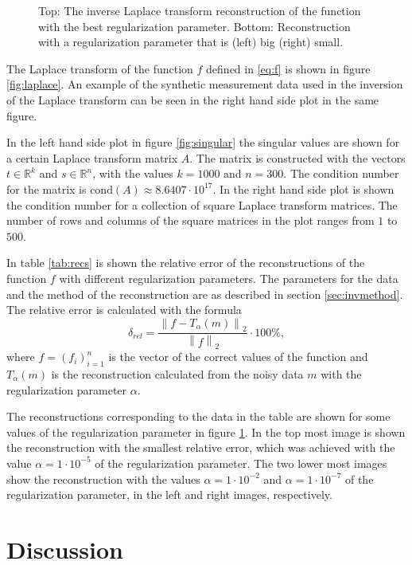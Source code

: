 \documentclass[12pt,a4]{article}
\newcommand{\R}{{\mathbb R}}
\newcommand{\cond}{\ensuremath{\text{cond}}}
\begin{document}
\begin{figure}[h!]
\begin{center}
\end{center}
\caption{Top: The inverse Laplace transform reconstruction of the function with the best regularization parameter. Bottom: Reconstruction with a regularization parameter that is (left) big (right) small.}
\label{fig:reconstruction}
\end{figure}


The Laplace transform of the function $f$ defined in \eqref{eq:f} is shown in figure \ref{fig:laplace}. An example of the synthetic measurement data used in the inversion of the Laplace transform can be seen in the right hand side plot in the same figure.

In the left hand side plot in figure \ref{fig:singular} the singular values are shown for a certain Laplace transform matrix $A$. The matrix is constructed with the vectors $t \in \R^k$ and $s \in \R^n$, with the values $k = 1000$ and $n = 300$. The condition number for the matrix is $\cond(A) \approx 8.6407 \cdot 10^{17}$. In the right hand side plot is shown the condition number for a collection of square Laplace transform matrices. The number of rows and columns of the square matrices in the plot ranges from $1$ to $500$.

In table \ref{tab:recs} is shown the relative error of the reconstructions of the function $f$ with different regularization parameters. The parameters for the data and the method of the reconstruction are as described in section \ref{sec:invmethod}. The relative error is calculated with the formula
\begin{equation}
\delta_{rel} = \frac{\left\| f - T_{\alpha}(m) \right\|_2}{\left\| f \right\|_2} \cdot 100 \%,
\end{equation}
where $f = (f_i)_{i=1}^n$ is the vector of the correct values of the function and $T_{\alpha}(m)$ is the reconstruction calculated from the noisy data $m$ with the regularization parameter $\alpha$.

The reconstructions corresponding to the data in the table are shown for some values of the regularization parameter in figure \ref{fig:reconstruction}. In the top most image is shown the reconstruction with the smallest relative error, which was achieved with the value $\alpha = 1 \cdot 10^{-5}$ of the regularization parameter. The two lower most images show the reconstruction with the values $\alpha = 1 \cdot 10^{-2}$ and $\alpha = 1 \cdot 10^{-7}$ of the regularization parameter, in the left and right images, respectively.


\section{Discussion}
\end{document}
